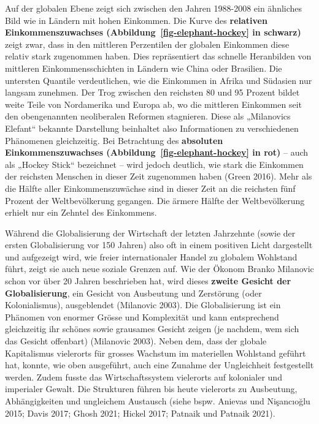 \documentclass[
  nswissgerman,
  a4paper,
  DIV=11,
  numbers=noendperiod,
  oneside,
  openany]{scrreprt}
\begin{document}
Auf der globalen Ebene zeigt sich zwischen den Jahren 1988-2008 ein
ähnliches Bild wie in Ländern mit hohen Einkommen. Die Kurve des
\textbf{relativen Einkommenszuwachses
(Abbildung~\ref{fig-elephant-hockey} in schwarz)} zeigt zwar, dass in
den mittleren Perzentilen der globalen Einkommen diese relativ stark
zugenommen haben. Dies repräsentiert das schnelle Heranbilden von
mittleren Einkommensschichten in Ländern wie China oder Brasilien. Die
untersten Quantile verdeutlichen, wie die Einkommen in Afrika und
Südasien nur langsam zunehmen. Der Trog zwischen den reichsten 80 und 95
Prozent bildet weite Teile von Nordamerika und Europa ab, wo die
mittleren Einkommen seit den obengenannten neoliberalen Reformen
stagnieren. Diese als „Milanovics Elefant`` bekannte Darstellung
beinhaltet also Informationen zu verschiedenen Phänomenen gleichzeitig.
Bei Betrachtung des \textbf{absoluten Einkommenszuwachses
(Abbildung~\ref{fig-elephant-hockey} in rot)} -- auch als „Hockey
Stick`` bezeichnet -- wird jedoch deutlich, wie stark die Einkommen der
reichsten Menschen in dieser Zeit zugenommen haben (Green 2016). Mehr
als die Hälfte aller Einkommenszuwächse sind in dieser Zeit an die
reichsten fünf Prozent der Weltbevölkerung gegangen. Die ärmere Hälfte
der Weltbevölkerung erhielt nur ein Zehntel des Einkommens.

Während die Globalisierung der Wirtschaft der letzten Jahrzehnte (sowie
der ersten Globalisierung vor 150 Jahren) also oft in einem positiven
Licht dargestellt und aufgezeigt wird, wie freier internationaler Handel
zu globalem Wohlstand führt, zeigt sie auch neue soziale Grenzen auf.
Wie der Ökonom Branko Milanovic schon vor über 20 Jahren beschrieben
hat, wird dieses \textbf{zweite Gesicht der Globalisierung}, ein Gesicht
von Ausbeutung und Zerstörung (oder Kolonialismus), ausgeblendet
(Milanovic 2003). Die Globalisierung ist ein Phänomen von enormer Grösse
und Komplexität und kann entsprechend gleichzeitig ihr schönes sowie
grausames Gesicht zeigen (je nachdem, wem sich das Gesicht offenbart)
(Milanovic 2003). Neben dem, dass der globale Kapitalismus vielerorts
für grosses Wachstum im materiellen Wohlstand geführt hat, konnte, wie
oben ausgeführt, auch eine Zunahme der Ungleichheit festgestellt werden.
Zudem fusste das Wirtschaftssystem vielerorts auf kolonialer und
imperialer Gewalt. Die Strukturen führen bis heute vielerorts zu
Ausbeutung, Abhängigkeiten und ungleichem Austausch (siehe bspw. Anievas
und Nişancıoğlu 2015; Davis 2017; Ghosh 2021; Hickel 2017; Patnaik und
Patnaik 2021).
\end{document}
